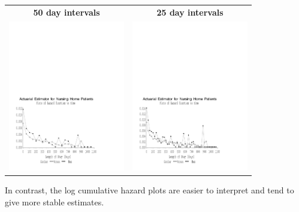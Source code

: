 \documentclass[envcountsect, 10pt, portrait, palatino]{beamer}
\begin{document}
\begin{frame}
\begin{center}
\begin{tabular}{cc}
{\bf 50 day intervals} & {\bf 25 day intervals}\\
\includegraphics[width=2in]{hazards_nh3.pdf} &
\includegraphics[width=2in]{hazards_nh4.pdf}
\end{tabular}
\end{center}
In contrast, the log cumulative hazard plots are easier to
interpret and tend to give more stable estimates.
\end{frame}
\end{document}
